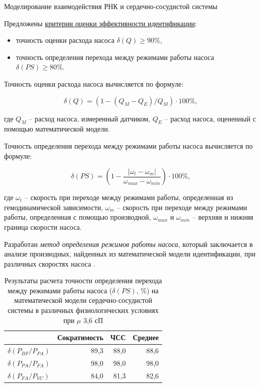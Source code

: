 \documentclass[a4paper, 9pt]{beamer}
\begin{document}
\begin{frame}{Моделирование взаимодействия РНК и сердечно-сосудистой системы}
\begin{minipage}[ht]{0.64\textwidth}
\vskip6pt
Предложены \underline{критерии оценки эффективности идентификации}:
\vskip-3pt
\begin{itemize}
 \item точность оценки расхода насоса $\delta(Q) \geq 90\%$, \vskip-5pt
 \item \vskip-3pt точность определения перехода между режимами работы насоса $\delta(PS) \geq 80\%$.
\end{itemize}

\vskip-3pt
\tiny Точность оценки расхода насоса вычисляется по формуле:

\vskip-4pt
\begin{equation}
	\delta(Q) = \left( 1 - (Q_M - Q_E)/Q_M \right) \cdot 100 \%,
\end{equation}

\vskip-3pt
где $Q_M$ -- расход насоса, измеренный датчиком, $Q_E$ -- расход насоса, оцененный с помощью математической модели. 

Точность определения перехода между режимами работы насоса вычисляется по формуле:

\vskip-8pt
\begin{equation}
	\delta(PS) = \left(1 - \frac{\lvert \omega_t - \omega_m \rvert}{\omega_{max} - \omega_{min}} \right) \cdot 100\%,
\end{equation}

\vskip-2pt
где $\omega_t$ -- скорость при переходе между режимами работы, определенная из гемодинамической зависимости, $\omega_m$ -- скорость при переходе между режимами работы, определенная с помощью производной, $\omega_{max}$ и $\omega_{min}$ -- верхняя и нижняя граница скорости насоса.

\vskip3pt
Разработан \emph{метод определения режимов работы насоса}, который заключается в анализе производных, найденных из математической модели идентификации, при различных скоростях насоса \footnotemark[1]. 

\vskip-11pt
\tiny
\setcounter{table}{0}
\begin{table}
\caption{\tiny Результаты расчета точности определения перехода между режимами работы насоса ($\delta(PS)$, \%) на математической модели сердечно-сосудистой системы в различных физиологических условиях при $\mu$ 3,6 сП}\vskip-5pt
\begin{tabular}{lrrr}
\toprule
 & Сократимость & ЧСС & Среднее\\
\midrule
$\delta(P_{BF}/P_{PA})$				& 89,3		&	88,0		& 88,6\\
$\delta(P_{PA}/P_{FA})$				& 98,0		& 98,0		& 98,0\\
$\delta(P_{FA}/P_{VC})$			& 84,0		& 81,3		& 82,6\\
\bottomrule
\end{tabular}
\end{table}


\end{minipage}
\end{frame}
\end{document}
